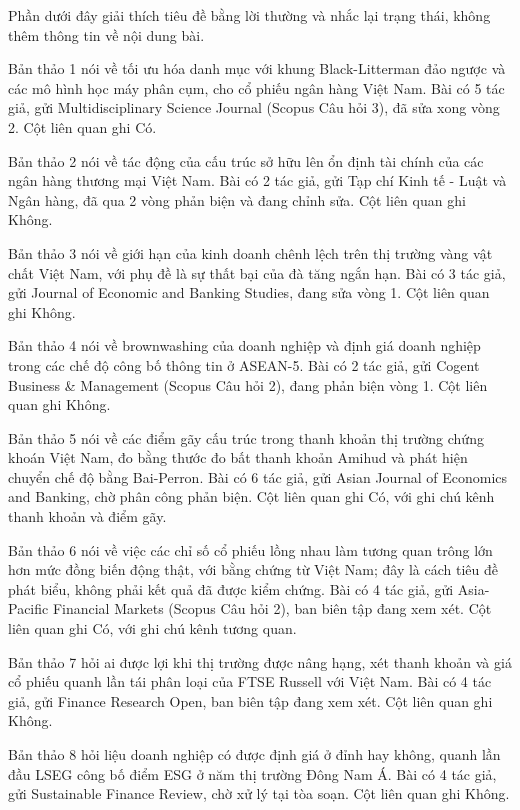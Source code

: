 Phần dưới đây giải thích tiêu đề bằng lời thường và nhắc lại trạng thái, không thêm thông tin về nội dung bài.

Bản thảo 1 nói về tối ưu hóa danh mục với khung Black-Litterman đảo ngược và các mô hình học máy phân cụm, cho cổ phiếu ngân hàng Việt Nam. Bài có 5 tác giả, gửi Multidisciplinary Science Journal (Scopus Câu hỏi 3), đã sửa xong vòng 2. Cột liên quan ghi Có.

Bản thảo 2 nói về tác động của cấu trúc sở hữu lên ổn định tài chính của các ngân hàng thương mại Việt Nam. Bài có 2 tác giả, gửi Tạp chí Kinh tế - Luật và Ngân hàng, đã qua 2 vòng phản biện và đang chỉnh sửa. Cột liên quan ghi Không.

Bản thảo 3 nói về giới hạn của kinh doanh chênh lệch trên thị trường vàng vật chất Việt Nam, với phụ đề là sự thất bại của đà tăng ngắn hạn. Bài có 3 tác giả, gửi Journal of Economic and Banking Studies, đang sửa vòng 1. Cột liên quan ghi Không.

Bản thảo 4 nói về brownwashing của doanh nghiệp và định giá doanh nghiệp trong các chế độ công bố thông tin ở ASEAN-5. Bài có 2 tác giả, gửi Cogent Business \& Management (Scopus Câu hỏi 2), đang phản biện vòng 1. Cột liên quan ghi Không.

Bản thảo 5 nói về các điểm gãy cấu trúc trong thanh khoản thị trường chứng khoán Việt Nam, đo bằng thước đo bất thanh khoản Amihud và phát hiện chuyển chế độ bằng Bai-Perron. Bài có 6 tác giả, gửi Asian Journal of Economics and Banking, chờ phân công phản biện. Cột liên quan ghi Có, với ghi chú kênh thanh khoản và điểm gãy.

Bản thảo 6 nói về việc các chỉ số cổ phiếu lồng nhau làm tương quan trông lớn hơn mức đồng biến động thật, với bằng chứng từ Việt Nam; đây là cách tiêu đề phát biểu, không phải kết quả đã được kiểm chứng. Bài có 4 tác giả, gửi Asia-Pacific Financial Markets (Scopus Câu hỏi 2), ban biên tập đang xem xét. Cột liên quan ghi Có, với ghi chú kênh tương quan.

Bản thảo 7 hỏi ai được lợi khi thị trường được nâng hạng, xét thanh khoản và giá cổ phiếu quanh lần tái phân loại của FTSE Russell với Việt Nam. Bài có 4 tác giả, gửi Finance Research Open, ban biên tập đang xem xét. Cột liên quan ghi Không.

Bản thảo 8 hỏi liệu doanh nghiệp có được định giá ở đỉnh hay không, quanh lần đầu LSEG công bố điểm ESG ở năm thị trường Đông Nam Á. Bài có 4 tác giả, gửi Sustainable Finance Review, chờ xử lý tại tòa soạn. Cột liên quan ghi Không.


